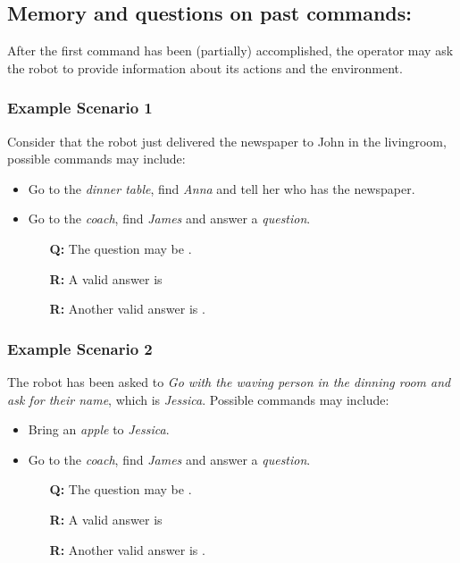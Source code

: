 \subsection{Memory and questions on past commands:} After the first command has been (partially) accomplished, the operator may ask the robot to provide information about its actions and the environment.

\subsubsection{Example Scenario 1}
Consider that the robot just delivered the newspaper to John in the livingroom, possible commands may include:

\begin{itemize}
	\item Go to the \textit{dinner table}, find \textit{Anna} and tell her who has the newspaper.
	\item Go to the \textit{coach}, find \textit{James} and answer a \textit{question}.
	\begin{itemize} 
		\item[\textbf{Q:}] The question may be .
		\item[\textbf{R:}] A valid answer is 
		\item[\textbf{R:}] Another valid answer is .
	\end{itemize}
\end{itemize}

\subsubsection{Example Scenario 2}
The robot has been asked to \textit{Go with the waving person in the dinning room and ask for their name}, which is \textit{Jessica}. Possible commands may include:

\begin{itemize}
	\item Bring an \textit{apple} to \textit{Jessica}.
	\item Go to the \textit{coach}, find \textit{James} and answer a \textit{question}.
	\begin{itemize} 
		\item[\textbf{Q:}] The question may be .
		\item[\textbf{R:}] A valid answer is 
		\item[\textbf{R:}] Another valid answer is .
	\end{itemize}
\end{itemize}

